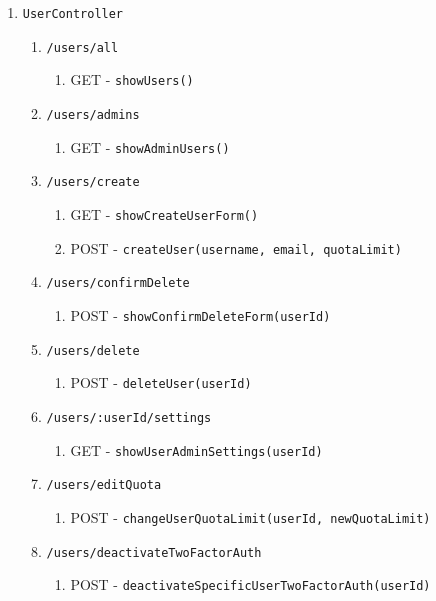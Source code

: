 \documentclass[12pt,DIV14,BCOR10mm,a4paper,parskip=half-,headsepline,headinclude,english,ngerman,bibliography=totocnumbered]{scrreprt}
\begin{document}
\begin{enumerate}
\begin{enumerate}
    \item \texttt{UserController}
    \begin{enumerate}
      \item \texttt{/users/all}
      \begin{enumerate}
        \item GET - \texttt{showUsers()}
      \end{enumerate}
      \item \texttt{/users/admins}
      \begin{enumerate}
        \item GET - \texttt{showAdminUsers()}
      \end{enumerate}
      \item \texttt{/users/create}
      \begin{enumerate}
        \item GET - \texttt{showCreateUserForm()}
        \item POST - \texttt{createUser(username, email, quotaLimit)}
      \end{enumerate}
      \item \texttt{/users/confirmDelete}
      \begin{enumerate}
        \item POST - \texttt{showConfirmDeleteForm(userId)}
      \end{enumerate}
      \item \texttt{/users/delete}
      \begin{enumerate}
        \item POST - \texttt{deleteUser(userId)}
      \end{enumerate}
      \item \texttt{/users/:userId/settings}
      \begin{enumerate}
        \item GET - \texttt{showUserAdminSettings(userId)}
      \end{enumerate}
      \item \texttt{/users/editQuota}
      \begin{enumerate}
        \item POST - \texttt{changeUserQuotaLimit(userId,
        newQuotaLimit)}
      \end{enumerate}
      \item \texttt{/users/deactivateTwoFactorAuth}
      \begin{enumerate}
        \item POST - \texttt{deactivateSpecificUserTwoFactorAuth(userId)}
      \end{enumerate}


\end{enumerate}
\end{enumerate}
\end{enumerate}
\end{document}
